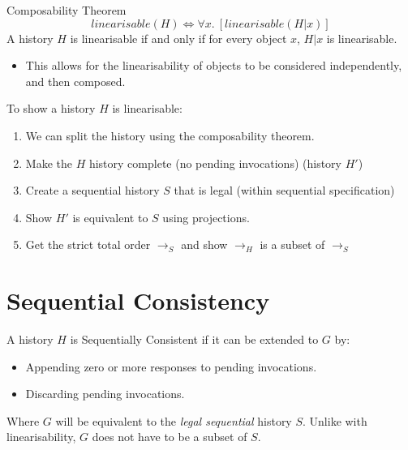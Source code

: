 \begin{definitionbox}{Composability Theorem}
	\[linearisable(H) \Leftrightarrow \forall x. \ [linearisable(H|x)]\]
	A history $H$ is linearisable if and only if for every object $x$, $H|x$ is linearisable.
	\begin{itemize}
		\item This allows for the linearisability of objects to be considered independently, and then composed.
	\end{itemize}
\end{definitionbox}
To show a history $H$ is linearisable:
\begin{enumerate}
	\item We can split the history using the composability theorem.
	\item Make the $H$ history complete (no pending invocations) (history $H'$)
	\item Create a sequential history $S$ that is legal (within sequential specification)
	\item Show $H'$ is equivalent to $S$ using projections.
	\item Get the strict total order $\to_S$ and show $\to_H$ is a subset of $\to_S$
\end{enumerate}


\section{Sequential Consistency}
A history $H$ is Sequentially Consistent if it can be extended to $G$ by:
\begin{itemize}
	\item Appending zero or more responses to pending invocations.
	\item Discarding pending invocations.
\end{itemize}
Where $G$ will be equivalent to the \textit{legal sequential} history $S$. Unlike with linearisability, $G$ does not have to be a subset of $S$.
